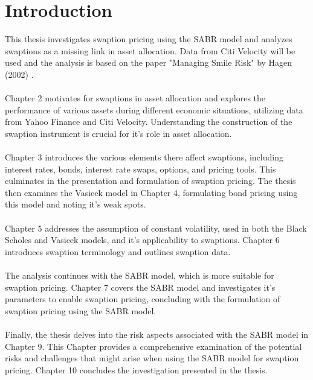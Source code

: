 \section{Introduction}

This thesis investigates swaption pricing using the SABR model
and analyzes swaptions as a missing link in asset allocation. 
Data from Citi Velocity will be used and the analysis is 
based on the paper "Managing Smile Risk" by Hagen (2002) 
\cite{Smile}.
\\\\
Chapter 2 motivates for swaptions 
in asset allocation and explores the performance 
of various assets during different economic situations, 
utilizing data from Yahoo Finance and Citi Velocity. 
Understanding the construction of the swaption instrument 
is crucial for it's role in asset allocation.
\\\\
Chapter 3 introduces the various elements there affect 
swaptions, including interest rates, bonds, interest 
rate swaps, options, and pricing tools. This culminates 
in the presentation and formulation of swaption pricing. 
The thesis then examines the Vasicek model in Chapter 4, 
formulating bond pricing using this model and noting it's 
weak spots.
\\\\
Chapter 5 addresses the assumption of constant volatility, 
used in both the Black Scholes and Vasicek models, 
and it's applicability to swaptions. Chapter 6 introduces 
swaption terminology and outlines swaption data.
\\\\
The analysis continues with the SABR model, which is 
more suitable for swaption pricing. Chapter 7 covers the SABR model 
and investigates it's parameters to enable swaption pricing, 
concluding with the formulation of swaption pricing using 
the SABR model.
\\\\
Finally, the thesis delves into the risk aspects associated 
with the SABR model in Chapter 9. This Chapter provides a 
comprehensive examination of the potential risks and 
challenges that might arise when using the SABR model 
for swaption pricing.
Chapter 10 concludes the investigation presented in the thesis. 
